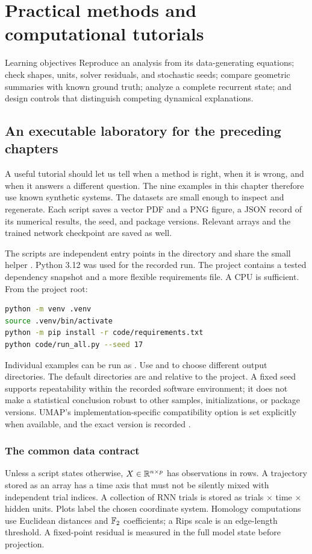 \chapter{Practical methods and computational tutorials}\label{ch:11}
\begin{insight}{Learning objectives}
Reproduce an analysis from its data-generating equations; check shapes, units, solver residuals, and stochastic seeds; compare geometric summaries with known ground truth; analyze a complete recurrent state; and design controls that distinguish competing dynamical explanations.
\end{insight}

\section{An executable laboratory for the preceding chapters}
A useful tutorial should let us tell when a method is right, when it is wrong, and when it answers a different question. The nine examples in this chapter therefore use known synthetic systems. The datasets are small enough to inspect and regenerate. Each script saves a vector PDF and a PNG figure, a JSON record of its numerical results, the seed, and package versions. Relevant arrays and the trained network checkpoint are saved as well.

The scripts are independent entry points in the  directory and share the small helper . Python 3.12 was used for the recorded run. The project contains a tested dependency snapshot and a more flexible requirements file. A CPU is sufficient. From the project root:
\begin{lstlisting}[language=bash]
python -m venv .venv
source .venv/bin/activate
python -m pip install -r code/requirements.txt
python code/run_all.py --seed 17
\end{lstlisting}
Individual examples can be run as . Use  and  to choose different output directories. The default directories are  and  relative to the project. A fixed seed supports repeatability within the recorded software environment; it does not make a statistical conclusion robust to other samples, initializations, or package versions. UMAP's implementation-specific compatibility option is set explicitly when available, and the exact version is recorded \citep{root_umap_docs}.

\subsection{The common data contract}
Unless a script states otherwise, $X\in\mathbb{R}^{n\times p}$ has observations in rows. A trajectory stored as an array has a time axis that must not be silently mixed with independent trial indices. A collection of RNN trials is stored as trials $\times$ time $\times$ hidden units. Plots label the chosen coordinate system. Homology computations use Euclidean distances and $\mathbb{F}_2$ coefficients; a Rips scale is an edge-length threshold. A fixed-point residual is measured in the full model state before projection.

